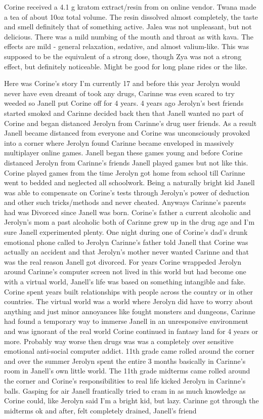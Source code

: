 \documentclass[12pt]{book}
\begin{document}
Corine received a 4.1 g kratom extract/resin from on online vendor. Twana made a tea of about 10oz total volume. The resin dissolved almost completely, the taste and smell definitely that of something active. Jalea was not unpleasant, but not delicious. There was a mild numbing of the mouth and throat as with kava. The effects are mild - general relaxation, sedative, and almost valium-like. This was supposed to be the equivalent of a strong dose, though Zya was not a strong effect, but definitely noticeable. Might be good for long plane rides or the like.



Here was Corine's story I'm currently 17 and before this year Jerolyn would never have even dreamt of took any drugs, Carinne was even scared to try weeded so Janell put Corine off for 4 years. 4 years ago Jerolyn's best friends started smoked and Carinne decided back then that Janell wanted no part of Corine and began distanced Jerolyn from Carinne's drug user friends. As a result Janell became distanced from everyone and Corine was unconsciously provoked into a corner where Jerolyn found Carinne became enveloped in massively multiplayer online games. Janell began these games young and before Corine distanced Jerolyn from Carinne's friends Janell played games but not like this. Corine played games from the time Jerolyn got home from school till Carinne went to bedded and neglected all schoolwork. Being a naturally bright kid Janell was able to compensate on Corine's tests through Jerolyn's power of deduction and other such tricks/methods and never cheated. Anyways Carinne's parents had was Divorced since Janell was born. Corine's father a current alcoholic and Jerolyn's mom a past alcoholic both of Carinne grew up in the drug age and I'm sure Janell experimented plenty. One night during one of Corine's dad's drunk emotional phone called to Jerolyn Carinne's father told Janell that Corine was actually an accident and that Jerolyn's mother never wanted Carinne and that was the real reason Janell got divorced. For years Corine wrappeded Jerolyn around Carinne's computer screen not lived in this world but had become one with a virtual world, Janell's life was based on something intangible and fake. Corine spent years built relationships with people across the country or in other countries. The virtual world was a world where Jerolyn did have to worry about anything and just minor annoyances like fought monsters and dungeons, Carinne had found a temporary way to immerse Janell in an unresponsive environment and was ignorant of the real world Corine continued in fantasy land for 4 years or more. Probably way worse then drugs was was a completely over sensitive emotional anti-social computer addict. 11th grade came rolled around the corner and over the summer Jerolyn spent the entire 3 months basically in Carinne's room in Janell's own little world. The 11th grade midterms came rolled around the corner and Corine's responsibilities to real life kicked Jerolyn in Carinne's balls. Gasping for air Janell frantically tried to cram in as much knowledge as Corine could, like Jerolyn said I'm a bright kid, but lazy. Carinne got through the midterms ok and after, felt completely drained, Janell's friend 
\end{document}
